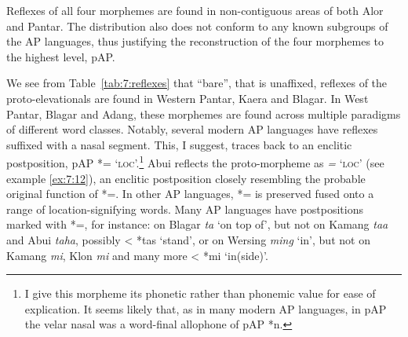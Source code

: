 Reflexes of all four morphemes are found in non-contiguous areas of both Alor and Pantar. The distribution also does not conform to any known subgroups of the AP languages, thus justifying the reconstruction of the four morphemes to the highest level, pAP.

 We see from Table~\ref{tab:7:reflexes} that ``bare'', that is unaffixed, reflexes of the proto-elevationals are found in Western Pantar, Kaera and Blagar. In West Pantar, Blagar and  Adang, these morphemes are found across multiple paradigms of different word classes. Notably, several modern AP languages have reflexes suffixed with a nasal segment. This, I suggest, traces back to an enclitic postposition, pAP *={\ng} `\textsc{loc}'.\footnote{I give this morpheme its phonetic rather than phonemic value for ease of explication. It seems likely that, as in many modern AP languages, in pAP the velar nasal was a word-final allophone of pAP *n.}  Abui reflects the proto-morpheme as \textit{=}\textit{{\ng}} `\textsc{loc}' (see example \ref{ex:7:12}),  an enclitic postposition closely resembling the probable original function of *={\ng}. In other AP languages, *={\ng} is preserved fused onto a range of location-signifying words. Many AP languages have postpositions marked with *={\ng}, for instance: on Blagar \textit{ta}\textit{{\ng}} `on top of', but not on Kamang \textit{taa} and Abui \textit{taha}, possibly {\textless} *tas `stand', or on Wersing \textit{ming} `in', but not on Kamang \textit{mi}, Klon \textit{mi} and many more {\textless} *mi `in(side)'. 

